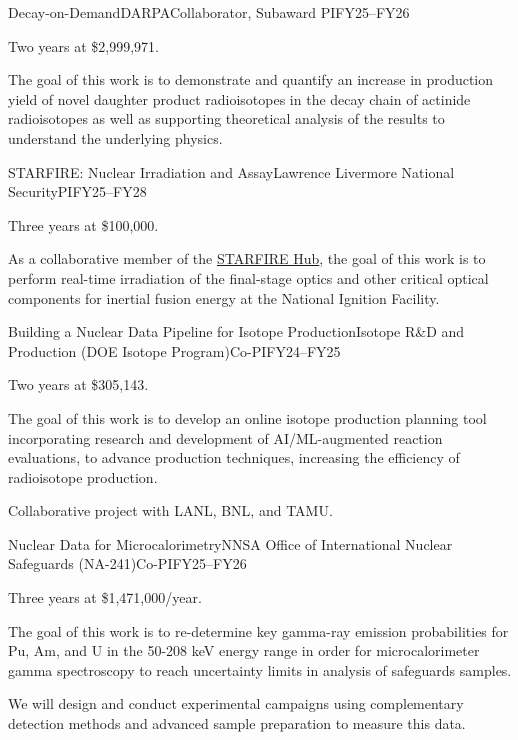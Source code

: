 \begin{rSubsection}{Decay-on-Demand}{\textnormal{DARPA}}{Collaborator, Subaward PI}{FY25--FY26}
\item    Two years at \$2,999,971.
\item The goal of this work is to demonstrate and quantify an increase in production yield of novel daughter product radioisotopes in the decay chain of actinide radioisotopes as well as supporting theoretical analysis of the results to understand the underlying physics.


\end{rSubsection}

\begin{rSubsection}{STARFIRE: Nuclear Irradiation and Assay}{\textnormal{Lawrence Livermore National Security}}{PI}{FY25--FY28}
\item    Three years at \$100,000.
\item As a collaborative member of the \href{https://ife.llnl.gov/starfire-hub}{STARFIRE Hub}, the goal of this work is to perform real-time irradiation of the final-stage optics and other critical optical components for inertial fusion energy at the National Ignition Facility.


\end{rSubsection}

\begin{rSubsection}{Building a Nuclear Data Pipeline for Isotope Production}{\textnormal{Isotope R\&D and Production (DOE Isotope Program)}}{Co-PI}{FY24--FY25}
\item    Two years at \$305,143.
\item The goal of this work is to develop an online isotope production planning tool incorporating research and development of AI/ML-augmented reaction evaluations, to  advance  production techniques, increasing the efficiency of radioisotope production.
\item Collaborative project with LANL, BNL, and TAMU.


\end{rSubsection}

\begin{rSubsection}{Nuclear Data for Microcalorimetry}{\textnormal{NNSA Office of International Nuclear Safeguards (NA-241)}}{Co-PI}{FY25--FY26}
\item    Three years at \$1,471,000/year.
\item The goal of this work is to re-determine key gamma-ray emission probabilities for Pu, Am, and U in the 50-208 keV energy range in order for microcalorimeter gamma spectroscopy to reach uncertainty limits in analysis of safeguards samples.
\item We will design and conduct experimental campaigns using complementary detection methods and advanced sample preparation to measure this data.


\end{rSubsection}

